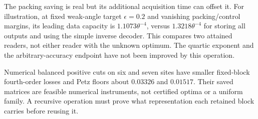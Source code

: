The packing saving is real but its additional acquisition time can offset
it. For illustration, at fixed weak-angle target $\epsilon=0.2$ and
vanishing packing/control margins, its leading data capacity is
$1.1073\theta^{-4}$, versus $1.3218\theta^{-4}$ for storing all outputs
and using the simple inverse decoder. This compares two attained readers,
not either reader with the unknown optimum. The quartic exponent and the
arbitrary-accuracy endpoint have not been improved by this operation.

Numerical balanced positive cuts on six and seven sites have smaller
fixed-block fourth-order losses and Petz floors about $0.03326$ and
$0.01517$. Their saved matrices are feasible numerical instruments, not
certified optima or a uniform family. A recursive operation must prove what
representation each retained block carries before reusing it.
